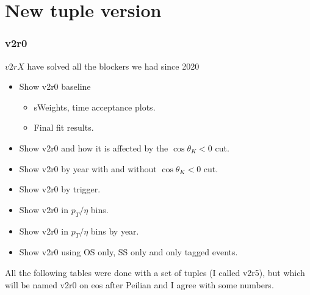 \documentclass[9pt,xcolor={table,svgnames},aspectratio=43]{beamer}
\begin{document}



\begin{frame}
  \maketitle
\end{frame}





\section{New tuple version}


\begin{frame}
\frametitle{v2r0}

$v2rX$ have solved all the blockers we had since 2020

\begin{itemize}
  \item Show v2r0 baseline
    \begin{itemize}
      \item sWeights, time acceptance plots.
      \item Final fit results.
    \end{itemize}
  \item Show v2r0 and how it is affected by the $\cos \theta_K <0$ cut.
  \item Show v2r0 by year with and without $\cos \theta_K <0$ cut.
  \item Show v2r0 by trigger.
  \item Show v2r0 in $p_T / \eta$ bins.
  \item Show v2r0 in $p_T / \eta$ bins by year.
  \item Show v2r0 using OS only, SS only and only tagged events.
\end{itemize}

\vfill
\footnotesize
All the following tables were done with a set of tuples (I called v2r5), but
which will be named v2r0 on eos after Peilian and I agree with some numbers.

\end{frame}
\end{document}
